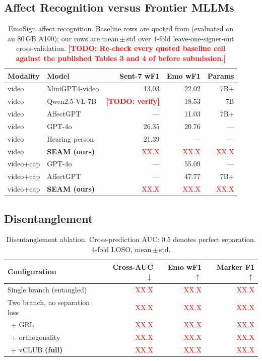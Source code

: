 \documentclass[conference]{IEEEtran}
\newcommand{\TODO}[1]{\textcolor{red}{\textbf{[TODO: #1]}}}
\newcommand{\NUM}{\textcolor{red}{XX.X}}
\begin{document}
\subsection{Affect Recognition versus Frontier MLLMs}
\begin{table}[t]
\caption{EmoSign affect recognition. Baseline rows are quoted from \cite{chua2025emosign}
(evaluated on an 80\,GB A100); our rows are mean\,$\pm$\,std over 4-fold
leave-one-signer-out cross-validation.
\TODO{Re-check every quoted baseline cell against the published Tables 3 and 4 of
\cite{chua2025emosign} before submission.}}
\label{tab:affect}
\centering
\small
\begin{tabular}{@{}llrrr@{}}
\toprule
Modality & Model & Sent-7 wF1 & Emo wF1 & Params \\
\midrule
video & MiniGPT4-video   & 13.03 & 22.02 & 7B+ \\
video & Qwen2.5-VL-7B    & \TODO{verify} & 18.53 & 7B \\
video & AffectGPT        & ---   & 11.03 & 7B+ \\
video & GPT-4o           & 26.35 & 20.76 & --- \\
video & Hearing person   & 21.39 & ---   & --- \\
video & \textbf{SEAM (ours)} & \NUM & \NUM & \NUM \\
\midrule
video+cap & GPT-4o       & ---   & 55.09 & --- \\
video+cap & AffectGPT    & ---   & 47.77 & 7B+ \\
video+cap & \textbf{SEAM (ours)} & \NUM & \NUM & \NUM \\
\bottomrule
\end{tabular}
\end{table}

\subsection{Disentanglement}
\begin{table}[t]
\caption{Disentanglement ablation. Cross-prediction AUC: 0.5 denotes perfect separation.
4-fold LOSO, mean\,$\pm$\,std.}
\label{tab:disentangle}
\centering
\small
\begin{tabular}{@{}lrrr@{}}
\toprule
Configuration & Cross-AUC $\downarrow$ & Emo wF1 $\uparrow$ & Marker F1 $\uparrow$ \\
\midrule
Single branch (entangled)      & \NUM & \NUM & \NUM \\
Two branch, no separation loss & \NUM & \NUM & \NUM \\
\ + GRL                        & \NUM & \NUM & \NUM \\
\ + orthogonality              & \NUM & \NUM & \NUM \\
\ + vCLUB \textbf{(full)}      & \NUM & \NUM & \NUM \\
\bottomrule
\end{tabular}
\end{table}
\end{document}

